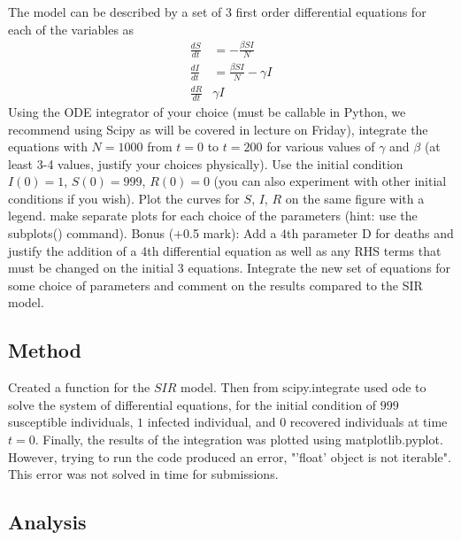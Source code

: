 \documentclass[12pt]{article}
\begin{document}
The model can be described by a set of 3 first order differential equations for each of the variables as
\begin{align}
    \frac{dS}{dt} &= -\frac{\beta SI}{N} \\
    \frac{dI}{dt} &= \frac{\beta SI}{N} - \gamma I \\
    \frac{dR}{dt} & \gamma I
\end{align}
Using the ODE integrator of your choice (must be callable in Python, we recommend using Scipy as will
be covered in lecture on Friday), integrate the equations with $N = 1000$ from $t = 0$ to $t = 200$ for various values of $\gamma$ and $\beta$ (at least 3-4 values, justify your choices physically).
Use the initial condition $I(0) = 1$, $S(0) = 999$, $R(0) = 0$ (you can also experiment with other initial conditions if you wish). Plot the curves for $S$, $I$, $R$ on the same figure with a legend. make separate plots for each choice of the parameters (hint: use the subplots() command).
Bonus (+0.5 mark): Add a $4$th parameter D for deaths and justify the addition of a 4th differential equation as well as any RHS terms that must be changed on the initial $3$ equations. Integrate the new set of equations
for some choice of parameters and comment on the results compared to the SIR model.

\subsection{Method}
Created a function for the $SIR$ model. Then from scipy.integrate used ode to solve the system of differential equations, for the initial condition of $999$ susceptible individuals, $1$ infected individual, and $0$ recovered individuals at time $t=0$. Finally, the results of the integration was plotted using matplotlib.pyplot. However, trying to run the code produced an error, "'float' object is not iterable".
This error was not solved in time for submissions.
 
\subsection{Analysis}
 
\end{document}
